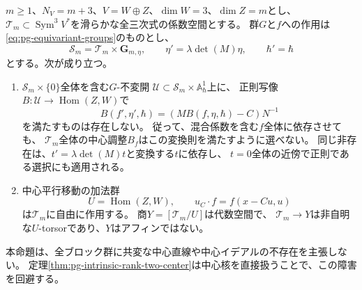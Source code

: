 \begin{proposition}[全係数空間における中心調整の障害]
\label{prop:pg-equivariant-global-centering-obstruction}
$m\ge1$、$N_V=m+3$、$V=W\oplus Z$、$\dim W=3$、$\dim Z=m$とし、
$\mathcal T_m\subset\operatorname{Sym}^3V^*$を滑らかな全三次式の係数空間とする。
群$G$と$f$への作用は\eqref{eq:pg-equivariant-groups}のものとし、
\begin{equation}
 \mathcal S_m=\mathcal T_m\times\mathbf G_{m,\eta},\qquad
 \eta'=\lambda\det(M)\eta,\qquad \hbar'=\hbar
 \label{eq:pg-global-centering-parameter-action}
\end{equation}
とする。次が成り立つ。
\begin{enumerate}
\item $\mathcal S_m\times\{0\}$全体を含む$G$-不変開
$\mathcal U\subset\mathcal S_m\times\mathbb A^1_\hbar$上に、
正則写像$B:\mathcal U\to\operatorname{Hom}(Z,W)$で
\begin{equation}
 B(f',\eta',\hbar)=(M B(f,\eta,\hbar)-C)N^{-1}
 \label{eq:pg-global-centering-desired-covariance}
\end{equation}
を満たすものは存在しない。
従って、混合係数を含む$f$全体に依存させても、
$\mathcal T_m$全体の中心調整$B_f$はこの変換則を満たすように選べない。
同じ非存在は、$t'=\lambda\det(M)t$と変換する$t$に依存し、
$t=0$全体の近傍で正則である選択にも適用される。
\item 中心平行移動の加法群
\begin{equation}
 U=\operatorname{Hom}(Z,W),\qquad
 u_C\cdot f=f(x-Cu,u)
 \label{eq:pg-global-centering-unipotent-action}
\end{equation}
は$\mathcal T_m$に自由に作用する。
商$Y=[\mathcal T_m/U]$は代数空間で、
$\mathcal T_m\to Y$は非自明な$U$-torsorであり、$Y$はアフィンではない。
\end{enumerate}
本命題は、全ブロック群に共変な中心直線や中心イデアルの不存在を主張しない。
定理\ref{thm:pg-intrinsic-rank-two-center}は中心核を直接扱うことで、この障害を回避する。
\end{proposition}
